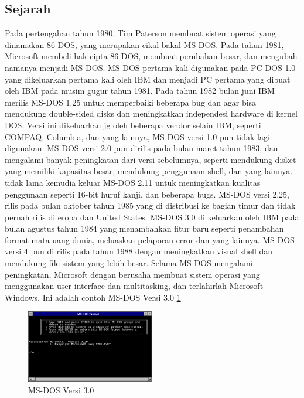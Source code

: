 		\subsection{Sejarah}
		\hspace{1cm}Pada pertengahan tahun 1980, Tim Paterson membuat sistem operasi yang dinamakan 86-DOS, yang merupakan cikal bakal MS-DOS. Pada tahun 1981, Microsoft membeli hak cipta 86-DOS, membuat perubahan besar, dan mengubah namanya menjadi MS-DOS. MS-DOS pertama kali digunakan pada PC-DOS 1.0 yang dikeluarkan pertama kali oleh IBM dan menjadi PC pertama yang dibuat oleh IBM pada musim gugur tahun 1981. Pada tahun 1982 bulan juni IBM merilis MS-DOS 1.25 untuk memperbaiki beberapa bug dan agar bisa mendukung double-sided disks dan meningkatkan independesi hardware di kernel DOS. Versi ini dikeluarkan jg oleh beberapa vendor selain IBM, seperti COMPAQ, Columbia, dan yang lainnya, MS-DOS versi 1.0 pun tidak lagi digunakan. MS-DOS versi 2.0 pun dirilis pada bulan maret tahun 1983, dan mengalami banyak peningkatan dari versi sebelumnya, seperti mendukung disket yang memiliki kapasitas besar, mendukung penggunaan shell, dan yang lainnya. tidak lama kemudia keluar MS-DOS 2.11 untuk meningkatkan kualitas penggunaan seperti 16-bit huruf kanji, dan beberapa bugs. MS-DOS versi 2.25, rilis pada bulan oktober tahun 1985 yang di distribusi ke bagian timur dan tidak pernah rilis di eropa dan United States. MS-DOS 3.0 di keluarkan oleh IBM pada bulan agustus tahun 1984 yang menambahkan fitur baru seperti penambahan format mata uang dunia, meluaskan pelaporan error dan yang lainnya. MS-DOS versi 4 pun di rilis pada tahun 1988 dengan meningkatkan visual shell dan mendukung file sistem yang lebih besar. Selama MS-DOS mengalami peningkatan, Microsoft dengan berusaha membuat sistem operasi yang menggunakan user interface dan multitasking, dan terlahirlah Microsoft Windows.
		\vspace{1cm} Ini adalah contoh MS-DOS Versi 3.0 \ref{win31}
		\begin{figure}[ht]
			\centerline{\includegraphics[width=0.5\textwidth]{figures/win31.png}}
			\caption{MS-DOS Versi 3.0}
			\label{win31}
			\end{figure}
		
